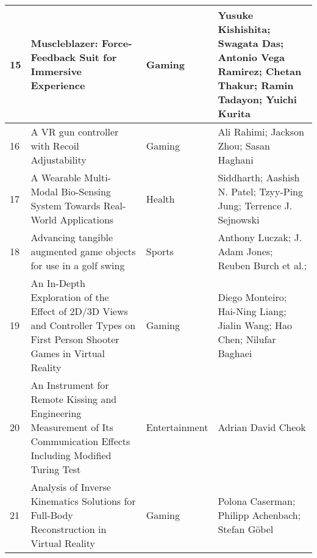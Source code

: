 \begin{landscape}
\begin{table}[]
{\begin{tabular}{|l|l|l|l|}
				15                               & Muscleblazer: Force-Feedback Suit for Immersive Experience                                                                                & Gaming                                   & Yusuke Kishishita; Swagata Das; Antonio Vega Ramirez; Chetan Thakur; Ramin Tadayon; Yuichi Kurita   \\ \hline
				16                               & A VR gun controller with Recoil Adjustability                                                                                             & Gaming                                   & Ali Rahimi; Jackson Zhou; Sasan Haghani                                                                   \\ \hline
				17                               & A Wearable Multi-Modal Bio-Sensing System Towards Real-World Applications                                                                 & Health                                   & Siddharth; Aashish N. Patel; Tzyy-Ping Jung; Terrence J. Sejnowski                                                                    \\ \hline
				18                               & Advancing tangible augmented game objects for use in a golf swing                                                                         & Sports                                   & Anthony Luczak; J. Adam Jones; Reuben Burch et al.;                                                        \\ \hline
				19                               & An In-Depth Exploration of the Effect of 2D/3D Views and Controller Types on First Person Shooter Games in Virtual Reality                & Gaming                                   & Diego Monteiro; Hai-Ning Liang; Jialin Wang; Hao Chen; Nilufar Baghaei                                                                   \\ \hline
				20                               & An Instrument for Remote Kissing and Engineering Measurement of Its Communication Effects Including Modified Turing Test                  & Entertainment                            & Adrian David Cheok                                                                   \\ \hline
				21                               & Analysis of Inverse Kinematics Solutions for Full-Body Reconstruction in Virtual Reality                                                  & Gaming                                   & Polona Caserman; Philipp Achenbach; Stefan Göbel                                                                      \\ \hline

\end{tabular}}
\end{table}
\end{landscape}
